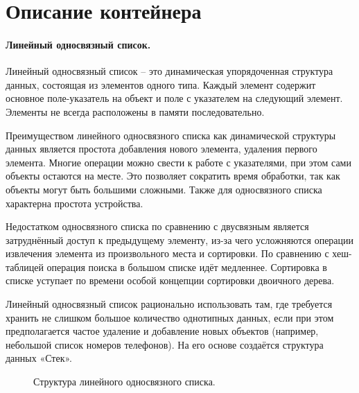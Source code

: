\section{Описание контейнера}

\paragraph{Линейный односвязный список.}

Линейный односвязный список – это динамическая упорядоченная структура данных, состоящая из элементов одного типа. Каждый элемент содержит основное поле-указатель на объект и поле с указателем на следующий элемент. Элементы не всегда расположены в памяти последовательно.

Преимуществом линейного односвязного списка как динамической структуры данных является простота добавления нового элемента, удаления первого элемента. Многие операции можно свести к работе с указателями, при этом сами объекты остаются на месте.
Это позволяет сократить время обработки, так как объекты могут быть большими сложными. Также для односвязного списка характерна простота устройства.

Недостатком односвязного списка по сравнению с двусвязным является затруднённый доступ к предыдущему элементу, из-за чего усложняются операции извлечения элемента из произвольного места и сортировки. По сравнению с хеш-таблицей операция поиска в большом списке идёт медленнее. Сортировка в списке уступает по времени особой концепции сортировки двоичного дерева.

Линейный односвязный список рационально использовать там, где требуется хранить не слишком большое количество однотипных данных, если при этом предполагается частое удаление и добавление новых объектов (например, небольшой список номеров телефонов). На его основе создаётся структура данных «Стек». 

\begin{figure}[h]
\caption{Структура линейного односвязного списка.}
\end{figure}